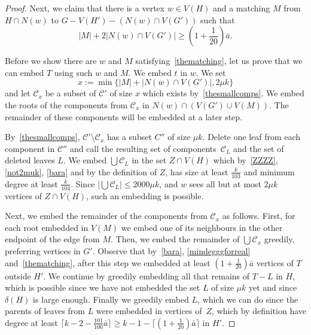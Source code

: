 \documentclass[12pt]{article}
\begin{document}
\begin{proof}
Next, we claim that there is a vertex $w\in V(H)$ and a matching 
$M$ from $H \cap N(w)$ to $G-V(H')-(N(w) \cap V(G'))$ such that 
    \begin{equation}\label{thematching}
        \text{$|M|+2|N(w)\cap V(G')| \ge (1+\frac{1}{20})\bar a$.}
         \end{equation}
         
         Before we show there are $w$ and $M$ satisfying~\eqref{thematching}, let us prove that we can embed $T$ using such $w$ and $M$.
         We embed $t$ in $w$. We set 
$$x:=\min\big\{|M|+|N(w)\cap V(G')|, 2\mu k\big\}$$ and let $\mathcal C_x$ be a subset of $\mathcal C'$ of size $x$ which exists by~\eqref{thesmallcomps}.
We embed 
 the roots of  the components  from $\mathcal C_x$ in $N(w) \cap (V(G')\cup V(M))$. The remainder of these components will be embedded at a later step.
 
By~\eqref{thesmallcomps}, $\mathcal C'\setminus\mathcal C_x$ has a subset $C''$ of size   $\mu k$. Delete one leaf from each  component in $\mathcal C''$ and call the resulting set of components~$\mathcal C_L$ and the set of deleted leaves $L$. 
We embed $\bigcup\mathcal C_L$   in the set $Z\cap V(H)$ which by~\eqref{ZZZZ}, \eqref{not2muk}, \eqref{bara} and by the definition of $Z$, has size at least $\frac k{103}$ and minimum degree at least $\frac{k}{104}$. 
Since  $|\bigcup\mathcal C_L|\le 2000\mu k$, and $w$ sees all but at most $2\mu k$ vertices of $Z\cap V(H)$, such an embedding is possible.

Next, we embed the remainder of the components  from $\mathcal C_x$ as follows. First, for each root embedded in $V(M)$ we embed one of its neighbours in the other endpoint of the edge from $M$. Then, we embed the remainder of  $\bigcup\mathcal C_x$ greedily, preferring vertices in $G'$. 
Observe that by~\eqref{bara}, \eqref{mindegggforreal} and~\eqref{thematching}, after this step
we embedded at least 
$(1+\frac{1}{20} )\bar a$
vertices of $T$ outside  $H'$.
We continue by 
 greedily embedding all that remains of $T-L$ in $H$, which is possible since we have not embedded the set $L$ of size $\mu k$ yet and since $\delta(H)$ is large enough. Finally we greedily embed  $L$, which we can do   since the parents of leaves from $L$ were embedded  in vertices of~$Z$, which by definition have degree at least $\lceil k-2-\frac{101}{100}\bar a\rceil \ge  k-1-\lceil(1+\frac{1}{20})\bar a\rceil$ in $H'$.




\end{proof}
\end{document}

